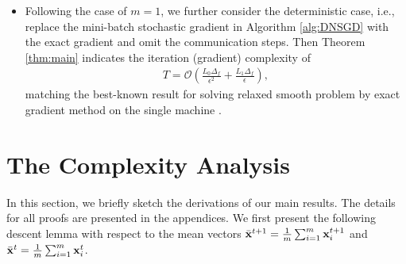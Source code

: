 \documentclass[sigconf]{acmart}
\def\vx{{\bf{x}}}
\def\fO{{\mathcal{O}}}
\theoremstyle{plain}
\def\bx{{\bar\vx}}
\begin{document}
\begin{itemize}[topsep=-4pt,itemsep=1.5pt,partopsep=1.8pt, parsep=1.8pt,leftmargin=0.65cm]
    In addition, \citet{zhang2020improved} assume the algorithm can access the exact gradient at the initial point, while their complexity bound does not include the cost of achieving the the exact gradient at the initial point. 
    In contrast, our analysis considers the access of the initial gradient estimator by stochastic first-order oracle, leading to the terms~$\sigma^2\epsilon^{-2}$ and~$L_1^2L_0^{-2}\sigma^2$ in our upper bound (\ref{eq:sample-single}).
    Recently, \citet{liu2024nonconvex} study the more general stochastic gradient estimator with heavy-tailed noise, while applying their result to our setting leads to the term $\sigma^3\epsilon^{-3}$ in the upper bound on the sample complexity \citep[\mbox{Theorem 3.2~with} $p=2$]{liu2024nonconvex}. 
    \item Following the case of $m=1$, we further consider the deterministic case, i.e., replace the mini-batch stochastic gradient in Algorithm \ref{alg:DNSGD} with the exact gradient and omit the communication steps.
    Then Theorem \ref{thm:main} indicates the iteration (gradient) complexity of  
    \begin{align*}
        T=\fO\left(\frac{L_0\Delta_f}{\epsilon^2}+\frac{L_1\Delta_f}{\epsilon}\right), 
    \end{align*}
    matching the best-known result for solving relaxed smooth problem by exact gradient method on the single machine \cite[Theorem 3.1]{vankov2024optimizing}.

\end{itemize}


  
\section{The Complexity Analysis}

In this section, we briefly sketch the derivations of our main results. The details for all proofs are presented in the appendices.
We first present the following descent lemma with respect to the mean vectors $\bx^{t+1}=\frac{1}{m}\sum_{i=1}^m\vx_i^{t+1}$ and $\bx^t=\frac{1}{m}\sum_{i=1}^m\vx_i^t$.
\end{document}
